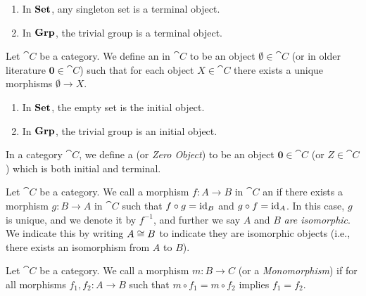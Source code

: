 \begin{node}[Category]
\begin{node}
\begin{node}[Examples]\label{cat-0014}%
\begin{enumerate}
\item In $\mathbf{Set}$, any singleton set is a terminal object.
\item In $\mathbf{Grp}$, the trivial group is a terminal object.
\end{enumerate}
\end{node}

\begin{definition}\label{cat-0015}%
Let $\cat{C}$ be a category. We define an  in
$\cat{C}$ to be an object $\emptyset\in\cat{C}$ (or in older literature $\mathbf{0}\in\cat{C}$)
such that for each object $X\in\cat{C}$ there exists a unique morphisms
$\emptyset\to X$.
\end{definition}

\begin{node}[Examples]\label{cat-0016}%
\begin{enumerate}
\item In $\mathbf{Set}$, the empty set is the initial object.
\item In $\mathbf{Grp}$, the trivial group is an initial object.
\end{enumerate}
\end{node}

\begin{definition}\label{cat-0017}%
In a category $\cat{C}$, we define a  (or
\textit{Zero Object}) to be an
object $\mathbf{0}\in\cat{C}$ (or $Z\in\cat{C}$) which is both initial
and terminal.
\end{definition}
\end{node}

\begin{node}\label{cat-000W}%

\begin{definition}\label{cat-000X}%
Let $\cat{C}$ be a category. We call a morphism $f\colon A\to B$ in
$\cat{C}$ an  if there exists a morphism $g\colon B\to A$
in $\cat{C}$ such that $f\circ g=\operatorname{id}_{B}$ and $g\circ f=\operatorname{id}_{A}$.
In this case, $g$ is unique, and we denote it by $f^{-1}$, and further
we say $A$ and $B$ \emph{are isomorphic}. We indicate this by writing
$A\cong B$ to indicate they are isomorphic objects (i.e., there exists an
isomorphism from $A$ to $B$).
\end{definition}

\begin{definition}\label{cat-000Y}%
Let $\cat{C}$ be a category.
We call a morphism $m\colon B\to C$  (or a \textit{Monomorphism})
if for all morphisms $f_{1},f_{2}\colon A\to B$ such that $m\circ f_{1}=m\circ f_{2}$
implies $f_{1}=f_{2}$.
\end{definition}


\end{node}
\end{node}
